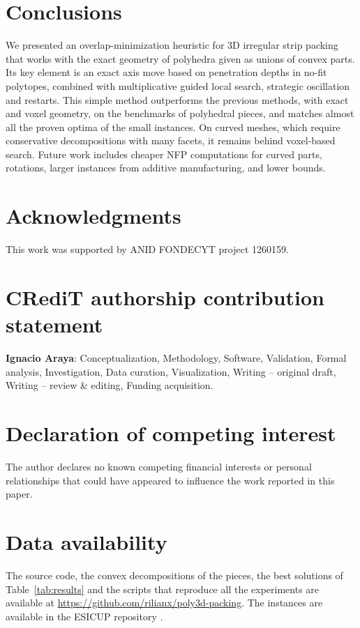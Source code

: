 \documentclass[preprint,12pt,authoryear]{elsarticle}
\begin{document}
\section{Conclusions}
We presented an overlap-minimization heuristic for 3D irregular strip packing that works with the exact geometry
of polyhedra given as unions of convex parts. Its key element is an exact axis move based on penetration depths
in no-fit polytopes, combined with multiplicative guided local search, strategic oscillation and restarts. This simple method outperforms
the previous methods, with exact and voxel geometry, on the benchmarks of polyhedral pieces, and matches almost
all the proven optima of the small instances. On curved meshes, which require conservative decompositions with
many facets, it remains behind voxel-based search. Future work includes cheaper NFP computations for curved
parts, rotations, larger instances from additive manufacturing, and lower bounds.

\section*{Acknowledgments}
This work was supported by ANID FONDECYT project 1260159.

\section*{CRediT authorship contribution statement}
\textbf{Ignacio Araya}: Conceptualization, Methodology, Software, Validation, Formal analysis, Investigation, Data
curation, Visualization, Writing -- original draft, Writing -- review \& editing, Funding acquisition.

\section*{Declaration of competing interest}
The author declares no known competing financial interests or personal relationships that could
have appeared to influence the work reported in this paper.

\section*{Data availability}
The source code, the convex decompositions of the pieces, the best solutions of Table~\ref{tab:results} and the
scripts that reproduce all the experiments are available at \url{https://github.com/rilianx/poly3d-packing}. The instances are
available in the ESICUP repository \citep{esicup}.
\end{document}
